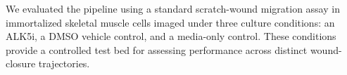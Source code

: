 We evaluated the pipeline using a standard scratch-wound migration assay in immortalized skeletal muscle cells \citep{Goetsch2011,Goetsch2013} imaged under three culture conditions: an ALK5i, a DMSO vehicle control, and a media-only control. These conditions provide a controlled test bed for assessing performance across distinct wound-closure trajectories.


%

